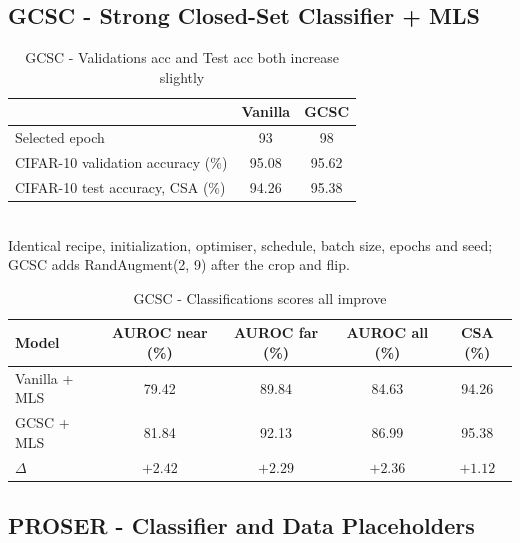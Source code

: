 \documentclass{article}
\begin{document}
\subsection{GCSC - Strong Closed-Set Classifier + MLS}

\begin{table}[H]
  \caption{GCSC - Validations acc and Test acc both increase slightly}
  \label{tab:gcsc-closed-set}
  \centering
  \begin{tabular}{lcc}
    \toprule
    & Vanilla & GCSC \\
    \midrule
    Selected epoch                      & 93    & 98    \\
    CIFAR-10 validation accuracy (\%)   & 95.08 & 95.62 \\
    CIFAR-10 test accuracy, CSA (\%)    & 94.26 & 95.38 \\
    \bottomrule
  \end{tabular}
  \\[2pt]
  \footnotesize Identical recipe, initialization, optimiser, schedule, batch size, epochs and seed;
  GCSC adds RandAugment(2, 9) after the crop and flip.
\end{table}

\begin{table}[H]
  \caption{GCSC - Classifications scores all improve}
  \label{tab:gcsc-auroc}
  \centering
  \begin{tabular}{lcccc}
    \toprule
    Model & AUROC near (\%) & AUROC far (\%) & AUROC all (\%) & CSA (\%) \\
    \midrule
    Vanilla + MLS & 79.42   & 89.84   & 84.63   & 94.26   \\
    GCSC + MLS    & 81.84   & 92.13   & 86.99   & 95.38   \\
    $\Delta$      & $+2.42$ & $+2.29$ & $+2.36$ & $+1.12$ \\
    \bottomrule
  \end{tabular}
\end{table}

\subsection{PROSER - Classifier and Data Placeholders}
\end{document}
